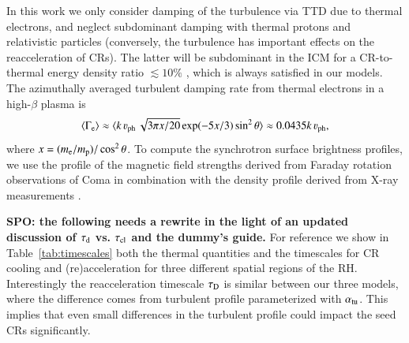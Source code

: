 \documentclass[fleqn,usenatbib,useAMS]{mnras}
\newcommand{\Vph}{\varv_\mathrm{ph}}
\def\SPO#1{{\bf {\color{red} SPO: #1}}}
\begin{document}
In this work we only consider damping of the turbulence via TTD due to
thermal electrons, and neglect subdominant damping with thermal
protons and relativistic particles (conversely, the turbulence has
important effects on the reacceleration of CRs). The latter will be
subdominant in the ICM for a CR-to-thermal energy density ratio
$\lesssim 10 \%$ \citep{brunetti07}, which is always satisfied in our
models. The azimuthally averaged turbulent damping rate from thermal
electrons \citep{brunetti07} in a high-$\beta$ plasma is
\begin{equation}
\label{eq:Gamma_e}
\langle\Gamma_{\rmn{e}}\rangle \approx \langle k\,\Vph\,\sqrt{3\upi
  x/20}\exp(-5x/3)\sin^2{\theta}\rangle\approx 0.0435k\,\Vph, 
\end{equation}
where $x=(m_{{\mathrm{e}}}/m_{{\mathrm{p}}})/\cos^2{\theta}$. To compute the
synchrotron surface brightness profiles, we use the profile of the
magnetic field strengths derived from Faraday rotation observations of
Coma \citep{bonafede10} in combination with the density profile
derived from X-ray measurements \citep{1992A&A...259L..31B}.

\SPO{the following needs a rewrite in the light of an updated discussion of
  $\tau_{\mathrm{d}}$ vs. $\tau_{{\mathrm{cl}}}$ and the dummy's guide.}  For reference we show in
Table~\ref{tab:timescales} both the thermal quantities and the
timescales for CR cooling and (re)acceleration for three different
spatial regions of the RH. Interestingly the reacceleration timescale
$\tau_{\rm D}$ is similar between our three models, where the
difference comes from turbulent profile parameterized with
$\alpha_{\mathrm{tu}}$. This implies that even small differences in the
turbulent profile could impact the seed CRs significantly.
\end{document}
